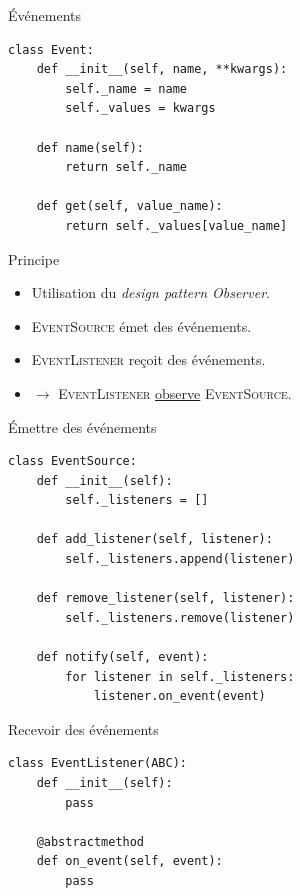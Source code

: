 \begin{frame}[fragile]{Événements}
  \footnotesize
  \begin{verbatim}
class Event:
    def __init__(self, name, **kwargs):
        self._name = name
        self._values = kwargs

    def name(self):
        return self._name

    def get(self, value_name):
        return self._values[value_name]
  \end{verbatim}
  \begin{block}{Principe}
    \begin{itemize}
    \item Utilisation du \textit{design pattern Observer}.
    \item \textsc{EventSource} émet des événements.
    \item \textsc{EventListener} reçoit des événements.
    \item $\rightarrow$ \textsc{EventListener} \underline{observe}
      \textsc{EventSource}.
    \end{itemize}
    
  \end{block}
\end{frame}

\begin{frame}[fragile]{Émettre des événements}
  \footnotesize
  \begin{verbatim}
class EventSource:
    def __init__(self):
        self._listeners = []

    def add_listener(self, listener):
        self._listeners.append(listener)

    def remove_listener(self, listener):
        self._listeners.remove(listener)

    def notify(self, event):
        for listener in self._listeners:
            listener.on_event(event)
  \end{verbatim}
\end{frame}

\begin{frame}[fragile]{Recevoir des événements}
  \footnotesize
  \begin{verbatim}
class EventListener(ABC):
    def __init__(self):
        pass

    @abstractmethod
    def on_event(self, event):
        pass
  \end{verbatim}
\end{frame}

